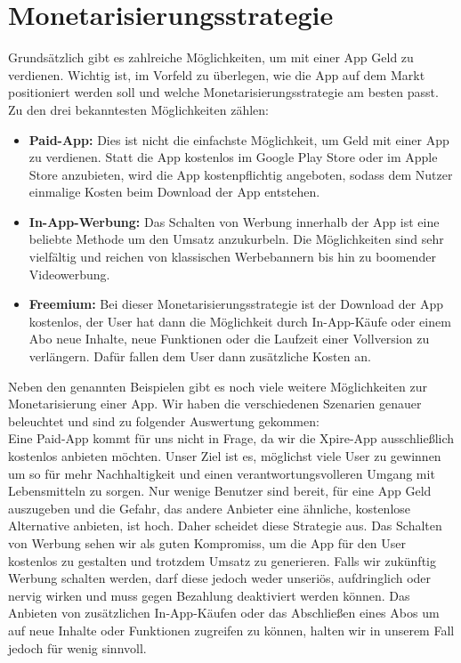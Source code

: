 \section{Monetarisierungsstrategie}
Grundsätzlich gibt es zahlreiche Möglichkeiten, um mit einer App Geld zu verdienen. Wichtig ist, im Vorfeld zu überlegen, wie die App auf dem Markt positioniert werden soll und welche Monetarisierungsstrategie am besten passt. Zu den drei bekanntesten Möglichkeiten zählen:
\begin{itemize}[noitemsep]
	\item \textbf{Paid-App:} Dies ist nicht die einfachste Möglichkeit, um Geld mit einer App zu verdienen. Statt die App kostenlos im Google Play Store oder im Apple Store anzubieten, wird die App kostenpflichtig angeboten, sodass dem Nutzer einmalige Kosten beim Download der App entstehen.
	\item \textbf{In-App-Werbung:} Das Schalten von Werbung innerhalb der App ist eine beliebte Methode um den Umsatz anzukurbeln. Die Möglichkeiten sind sehr vielfältig und reichen von klassischen Werbebannern bis hin zu boomender Videowerbung.
	\item \textbf{Freemium:} Bei dieser Monetarisierungsstrategie ist der Download der App kostenlos, der User hat dann die Möglichkeit durch In-App-Käufe oder einem Abo neue Inhalte, neue Funktionen oder die Laufzeit einer Vollversion zu verlängern. Dafür fallen dem User dann zusätzliche Kosten an.
\end{itemize}
Neben den genannten Beispielen gibt es noch viele weitere Möglichkeiten zur Monetarisierung einer App. Wir haben die verschiedenen Szenarien genauer beleuchtet und sind zu folgender Auswertung gekommen:\\
Eine Paid-App kommt für uns nicht in Frage, da wir die Xpire-App ausschließlich kostenlos anbieten möchten. Unser Ziel ist es, möglichst viele User zu gewinnen um so für mehr Nachhaltigkeit und einen verantwortungsvolleren Umgang mit Lebensmitteln zu sorgen. Nur wenige Benutzer sind bereit, für eine App Geld auszugeben und die Gefahr, das andere Anbieter eine ähnliche, kostenlose Alternative anbieten, ist hoch. Daher scheidet diese Strategie aus.
Das Schalten von Werbung sehen wir als guten Kompromiss, um die App für den User kostenlos zu gestalten und trotzdem Umsatz zu generieren. Falls wir zukünftig Werbung schalten werden, darf diese jedoch weder unseriös, aufdringlich oder nervig wirken und muss gegen Bezahlung deaktiviert werden können.
Das Anbieten von zusätzlichen In-App-Käufen oder das Abschließen eines Abos um auf neue Inhalte oder Funktionen zugreifen zu können, halten wir in unserem Fall jedoch für wenig sinnvoll.\\
